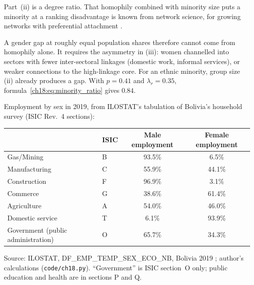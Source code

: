 \documentclass[../structural_economics_book.tex]{subfiles}
\begin{document}
Part~(ii) is a degree ratio. That homophily combined with minority size puts a minority at a ranking disadvantage is known from network science, for growing networks with preferential attachment \citep{avin2015homophily,karimi2018homophily}.

A gender gap at roughly equal population shares therefore cannot come from homophily alone. It requires the asymmetry in (iii): women channelled into sectors with fewer inter-sectoral linkages (domestic work, informal services), or weaker connections to the high-linkage core. For an ethnic minority, group size (ii) already produces a gap. With $p = 0.41$ and $\lambda_r = 0.35$, formula~\eqref{ch18:eq:minority_ratio} gives $0.84$.

\begin{example}\label{ch18:ex:bolivia_gender}
Employment by sex in 2019, from ILOSTAT's tabulation of Bolivia's household survey (ISIC Rev.~4 sections):

\begin{center}
\begin{tabular}{llcc}
\toprule
& ISIC & Male employment & Female employment \\
\midrule
Gas/Mining & B & 93.5\% & 6.5\% \\
Manufacturing & C & 55.9\% & 44.1\% \\
Construction & F & 96.9\% & 3.1\% \\
Commerce & G & 38.6\% & 61.4\% \\
Agriculture & A & 54.0\% & 46.0\% \\
Domestic service & T & 6.1\% & 93.9\% \\
Government (public administration) & O & 65.7\% & 34.3\% \\
\bottomrule
\end{tabular}
\par\footnotesize Source: ILOSTAT, DF\_EMP\_TEMP\_SEX\_ECO\_NB, Bolivia 2019 \citep{ilo2026ilostat}; author's calculations (\texttt{code/ch18.py}). ``Government'' is ISIC section~O only; public education and health are in sections P and Q.
\end{center}


\end{example}
\end{document}
